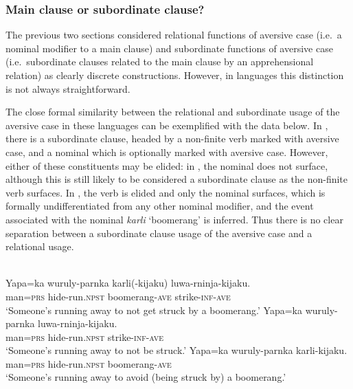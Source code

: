 \documentclass[output=paper,colorlinks,citecolor=brown]{langscibook}
\begin{document}
\subsubsection{Main clause or subordinate clause?}
\label{subsubsec:clause}

The previous two sections considered relational functions of aversive case (i.e.\  a nominal modifier to a main clause) and subordinate functions of aversive case (i.e.\  subordinate clauses related to the main clause by an apprehensional relation) as clearly discrete constructions. However, in  languages this distinction is not always straightforward.

The close formal similarity between the relational and subordinate usage of the aversive case in these languages can be exemplified with the  data below. In , there is a subordinate clause, headed by a non-finite verb marked with aversive case, and a nominal which is optionally marked with aversive case. However, either of these constituents may be elided: in , the nominal does not surface, although this is still likely to be considered a subordinate clause as the non-finite verb surfaces. In , the verb is elided and only the nominal surfaces, which is formally undifferentiated from any other nominal modifier, and the event associated with the nominal \textit{karli} `boomerang' is inferred. Thus there is no clear separation between a subordinate clause usage of the aversive case and a relational usage.



\ea\label{ex:bro27} 
 {\citealt[2]{laughren_expressing_2015}} \\
\ea\label{ex:bro27a}
\gll Yapa=ka wuruly-parnka karli(-kijaku) luwa-rninja-kijaku. \\
man=\textsc{prs} hide-run.\textsc{npst} boomerang-\textsc{ave} strike-\textsc{inf-ave} \\
\glt `Someone's running away to not get struck by a boomerang.'
\ex\label{ex:bro27b}
\gll Yapa=ka wuruly-parnka luwa-rninja-kijaku. \\
man=\textsc{prs} hide-run.\textsc{npst} strike-\textsc{inf-ave} \\
\glt `Someone's running away to not be struck.'
\ex\label{ex:bro27c} 
\gll Yapa=ka wuruly-parnka karli-kijaku. \\
man=\textsc{prs} hide-run.\textsc{npst} boomerang-\textsc{ave} \\
\glt `Someone's running away to avoid (being struck by) a boomerang.'
\z 
\z
\end{document}
